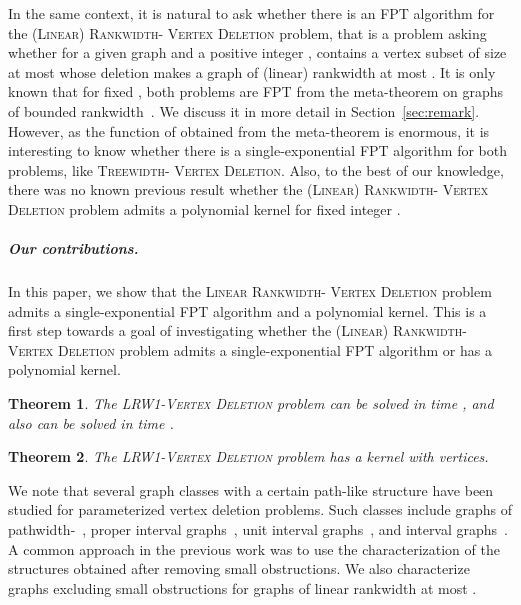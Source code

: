 \documentclass[11pt]{article}
\newtheorem{theorem}{Theorem}[section]
\theoremstyle{remark}
\newcommand{\LRWD}{\textsc{LRW1-Vertex Deletion} }
\begin{document}
In the same context, it is natural to ask whether there is an FPT algorithm for the \textsc{(Linear) Rankwidth- Vertex Deletion} problem, that is a problem asking whether for a given graph  and a positive integer ,  contains a vertex subset of size at most  whose deletion makes  a graph of (linear) rankwidth at most . 
It is only known that for fixed , both problems are FPT from the meta-theorem on graphs of bounded rankwidth~\cite{CourcelleMR00}. 
We discuss it in more detail in Section~\ref{sec:remark}.
However, as the function of  obtained from the meta-theorem is enormous, it is interesting to know whether there is a single-exponential FPT algorithm for both problems, like \textsc{Treewidth- Vertex Deletion}. 
Also, to the best of our knowledge, there was no known previous result whether the  \textsc{(Linear) Rankwidth- Vertex Deletion} problem admits a polynomial kernel for fixed integer .


\subparagraph{Our contributions.}  In this paper, we show that the \textsc{Linear Rankwidth- Vertex Deletion} problem admits a single-exponential FPT algorithm and a polynomial kernel. This is a first step towards a goal of investigating whether the \textsc{(Linear) Rankwidth- Vertex Deletion} problem admits a single-exponential FPT algorithm or has a polynomial kernel. 

\smallskip
\noindent
{}


\begin{theorem}\label{thm:main1}
The \LRWD problem can be solved in time , and also can be solved in time .
\end{theorem}

\begin{theorem}\label{thm:main2}
The \LRWD problem has a kernel with  vertices.
\end{theorem}

We note that 
several graph classes with a certain path-like structure have been
studied for parameterized vertex deletion 
problems. Such classes include graphs of pathwidth-~\cite{PhilipRV2010, CyganPPW2012},
proper interval graphs~\cite{FSV2012, VV2013}, unit interval graphs~\cite{BevernKM2010,Cao2015}, and interval graphs~\cite{CaoM2015}. A common approach in the previous work was to use the characterization of the structures obtained after removing small obstructions. We also characterize graphs excluding small obstructions for graphs of linear rankwidth at most .
\end{document}

